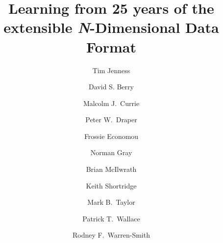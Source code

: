 \documentclass[final,authoryear,5p,times,twocolumn]{elsarticle}
\begin{document}
\begin{frontmatter}



\title{Learning from 25
  years of the extensible \emph{N}-Dimensional Data Format}


\author[cornell]{Tim Jenness}
\author[jac]{David S. Berry}
\author[jac]{Malcolm J.\ Currie}
\author[durham]{Peter W.\ Draper}
\author[noao]{Frossie Economou}
\author[glasgow]{Norman Gray}
\author[ral]{Brian McIlwrath}
\author[aao]{Keith Shortridge}
\author[bristol]{Mark B.\ Taylor}
\author[ral]{Patrick T.\ Wallace}
\author[ral]{Rodney F.\ Warren-Smith}


\address[cornell]{Department of Astronomy, Cornell University, Ithaca,
  NY 14853, USA}
\address[jac]{Joint Astronomy Centre, 660 N.\ A`oh\=ok\=u Place, Hilo, HI
  96720, USA}
\address[durham]{Department of Physics, Institute for Computational Cosmology, University of Durham, South Road, Durham DH1 3LE, UK}
\address[noao]{National Optical Astronomy
  Observatory, 950 N Cherry Ave, Tucson, AZ 85719, USA}
\address[glasgow]{SUPA School of Physics \& Astronomy, University of Glasgow, Glasgow G12 8QQ, UK}
\address[ral]{RAL Space, STFC Rutherford Appleton Laboratory, Harwell Oxford, Didcot, Oxfordshire OX11 0QX, UK}
\address[aao]{Australian Astronomical Observatory, 105 Delhi Rd, North
Ryde, NSW 2113, Australia}
\address[bristol]{H.\ H.\ Wills Physics Laboratory, Bristol University, Tyndall Avenue, Bristol, UK}


\end{frontmatter}
\end{document}
